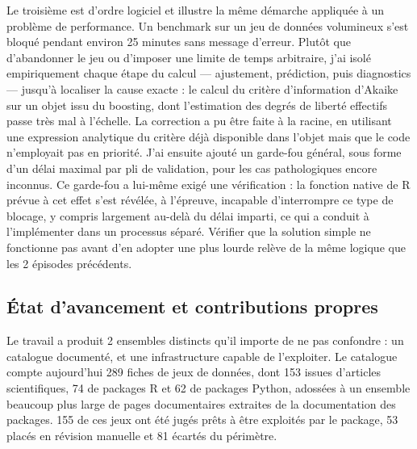 \documentclass[11pt,a4paper]{article}
\begin{document}
Le troisième est d'ordre logiciel et illustre la même démarche appliquée à un problème de performance. Un benchmark sur un jeu de données volumineux s'est bloqué pendant environ 25 minutes sans message d'erreur. Plutôt que d'abandonner le jeu ou d'imposer une limite de temps arbitraire, j'ai isolé empiriquement chaque étape du calcul --- ajustement, prédiction, puis diagnostics --- jusqu'à localiser la cause exacte : le calcul du critère d'information d'Akaike sur un objet issu du boosting, dont l'estimation des degrés de liberté effectifs passe très mal à l'échelle. La correction a pu être faite à la racine, en utilisant une expression analytique du critère déjà disponible dans l'objet mais que le code n'employait pas en priorité. J'ai ensuite ajouté un garde-fou général, sous forme d'un délai maximal par pli de validation, pour les cas pathologiques encore inconnus. Ce garde-fou a lui-même exigé une vérification : la fonction native de R prévue à cet effet s'est révélée, à l'épreuve, incapable d'interrompre ce type de blocage, y compris largement au-delà du délai imparti, ce qui a conduit à l'implémenter dans un processus séparé. Vérifier que la solution simple ne fonctionne pas avant d'en adopter une plus lourde relève de la même logique que les 2 épisodes précédents.

\subsection{État d'avancement et contributions propres}

Le travail a produit 2 ensembles distincts qu'il importe de ne pas confondre : un catalogue documenté, et une infrastructure capable de l'exploiter. Le catalogue compte aujourd'hui 289 fiches de jeux de données, dont 153 issues d'articles scientifiques, 74 de packages R et 62 de packages Python, adossées à un ensemble beaucoup plus large de pages documentaires extraites de la documentation des packages. 155 de ces jeux ont été jugés prêts à être exploités par le package, 53 placés en révision manuelle et 81 écartés du périmètre.
\end{document}
